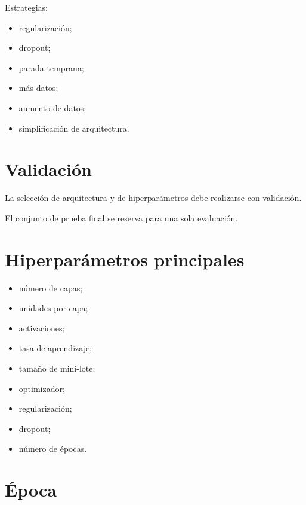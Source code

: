 \documentclass[
  spanish,
  10.5pt,
  letterpaper,
  DIV=11,
  numbers=noendperiod,
  oneside,
  open=any]{scrreprt}
\providecommand{\tightlist}{%
  \setlength{\itemsep}{0pt}\setlength{\parskip}{0pt}}
\theoremstyle{definition}
\theoremstyle{definition}
\theoremstyle{plain}
\theoremstyle{remark}
\begin{document}
Estrategias:

\begin{itemize}
\tightlist
\item
  regularización;
\item
  dropout;
\item
  parada temprana;
\item
  más datos;
\item
  aumento de datos;
\item
  simplificación de arquitectura.
\end{itemize}

\section*{Validación}\label{validaciuxf3n-1}


La selección de arquitectura y de hiperparámetros debe realizarse con
validación.

El conjunto de prueba final se reserva para una sola evaluación.

\section*{Hiperparámetros
principales}\label{hiperparuxe1metros-principales-1}


\begin{itemize}
\tightlist
\item
  número de capas;
\item
  unidades por capa;
\item
  activaciones;
\item
  tasa de aprendizaje;
\item
  tamaño de mini-lote;
\item
  optimizador;
\item
  regularización;
\item
  dropout;
\item
  número de épocas.
\end{itemize}

\section*{Época}\label{uxe9poca}
\end{document}
